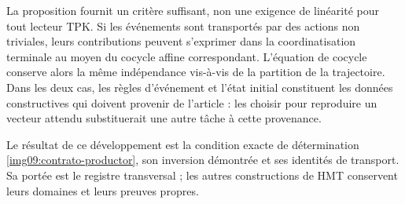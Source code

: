 La proposition fournit un critère suffisant, non une exigence de linéarité pour tout lecteur TPK. Si les événements sont transportés par des actions non triviales, leurs contributions peuvent s'exprimer dans la coordinatisation terminale au moyen du cocycle affine correspondant. L'équation de cocycle conserve alors la même indépendance vis-à-vis de la partition de la trajectoire. Dans les deux cas, les règles d'événement et l'état initial constituent les données constructives qui doivent provenir de l'article : les choisir pour reproduire un vecteur attendu substituerait une autre tâche à cette provenance.

Le résultat de ce développement est la condition exacte de détermination
\eqref{img09:contrato-productor}, son inversion démontrée et ses identités
de transport. Sa portée est le registre transversal ; les autres
constructions de HMT conservent leurs domaines et leurs preuves propres.
